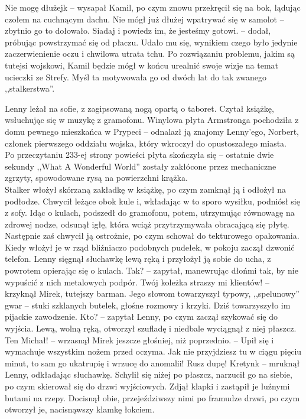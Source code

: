 \documentclass[../MAIN.tex]{subfiles}
\begin{document}
\sx Nie mogę dłużej\3k -- wysapał Kamil, po czym znowu przekręcił się na bok, lądując czołem na cuchnącym dachu.
\qd
Nie mógł już dłużej wpatrywać się w samolot -- zbytnio go to dołowało.
\sx Siadaj i powiedz im, że jesteśmy gotowi. -- dodał, próbując powstrzymać się od płaczu. Udało mu się, wynikiem czego było jedynie zaczerwienienie oczu i chwilowa utrata tchu.
\qd
Po rozwiązaniu problemu, jakim są tutejsi wojskowi, Kamil będzie mógł w końcu urealnić swoje wizje na temat ucieczki ze Strefy. Myśl ta motywowała go od dwóch lat do tak zwanego ,,stalkerstwa''.

Lenny leżał na sofie, z zagipsowaną nogą opartą o taboret. Czytał książkę, wsłuchując się w muzykę z gramofonu. Winylowa płyta Armstronga pochodziła z domu pewnego mieszkańca w Prypeci -- odnalazł ją znajomy Lenny'ego, Norbert, członek pierwszego oddziału wojska, który wkroczył do opustoszałego miasta.\\
Po przeczytaniu 233-ej strony powieści płyta skończyła się -- ostatnie dwie sekundy ,,What A Wonderful World'' zostały zakłócone przez mechaniczne zgrzyty, spowodowane rysą na powierzchni krążka.\\
Stalker włożył skórzaną zakładkę w książkę, po czym zamknął ją i odłożył na podłodze. Chwycił leżące obok kule i, wkładając w to sporo wysiłku, podniósł się z sofy. Idąc o kulach, podszedł do gramofonu, potem, utrzymując równowagę na zdrowej nodze, odsunął igłę, która wciąż przytrzymywała obracającą się płytę. Następnie zaś chwycił ją ostrożnie, po czym schował do tekturowego opakowania. Kiedy włożył je w rząd bliźniaczo podobnych pudełek, w pokoju zaczął dzwonić telefon. Lenny sięgnął słuchawkę lewą ręką i przyłożył ją sobie do ucha, z powrotem opierając się o kulach.
\sx Tak? -- zapytał, manewrując dłońmi tak, by nie wypuścić z nich metalowych podpór.
\xx Twój koleżka straszy mi klientów! -- krzyknął Mirek, tutejszy barman. Jego słowom towarzyszył typowy, ,,spelunowy'' gwar -- stuki szklanych butelek, głośne rozmowy i krzyki. Dziś towarzyszyło im pijackie zawodzenie.
\xx Kto? -- zapytał Lenny, po czym zaczął szykować się do wyjścia. Lewą, wolną ręką, otworzył szufladę i niedbale wyciągnął z niej płaszcz.
\xx Ten Michał! -- wrzasnął Mirek jeszcze głośniej, niż poprzednio. -- Upił się i wymachuje wszystkim nożem przed oczyma. Jak nie przyjdziesz tu w ciągu pięciu minut, to sam go ukatrupię i wrzucę do anomalii! Rusz dupę!
\xx Kretyn\3k -- mruknął Lenny, odkładając słuchawkę.
\qd
Schylił się niżej po płaszcz, narzucił go na siebie, po czym skierował się do drzwi wyjściowych. Zdjął klapki i zastąpił je luźnymi butami na rzepy. Docisnął obie, przejeździwszy nimi po framudze drzwi, po czym otworzył je, nacisnąwszy klamkę łokciem.\\
\end{document}
